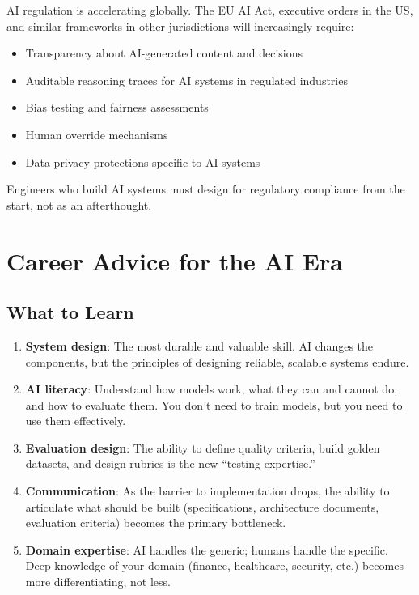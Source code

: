 AI regulation is accelerating globally. The EU AI Act, executive orders in the US, and similar frameworks in other jurisdictions will increasingly require:

\begin{itemize}[leftmargin=*]
    \item Transparency about AI-generated content and decisions
    \item Auditable reasoning traces for AI systems in regulated industries
    \item Bias testing and fairness assessments
    \item Human override mechanisms
    \item Data privacy protections specific to AI systems
\end{itemize}

Engineers who build AI systems must design for regulatory compliance from the start, not as an afterthought.


\section{Career Advice for the AI Era}

\subsection{What to Learn}

\begin{enumerate}[leftmargin=*]
    \item \textbf{System design}: The most durable and valuable skill. AI changes the components, but the principles of designing reliable, scalable systems endure.
    \item \textbf{AI literacy}: Understand how models work, what they can and cannot do, and how to evaluate them. You don't need to train models, but you need to use them effectively.
    \item \textbf{Evaluation design}: The ability to define quality criteria, build golden datasets, and design rubrics is the new ``testing expertise.''
    \item \textbf{Communication}: As the barrier to implementation drops, the ability to articulate what should be built (specifications, architecture documents, evaluation criteria) becomes the primary bottleneck.
    \item \textbf{Domain expertise}: AI handles the generic; humans handle the specific. Deep knowledge of your domain (finance, healthcare, security, etc.) becomes more differentiating, not less.
\end{enumerate}


